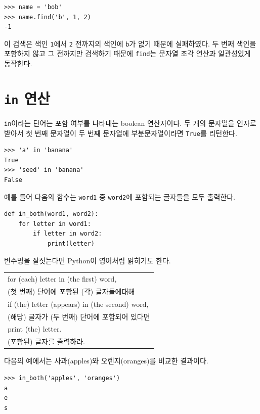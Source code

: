 \documentclass[10pt]{book}
\begin{document}
\begin{verbatim}
>>> name = 'bob'
>>> name.find('b', 1, 2)
-1
\end{verbatim}
%
이 검색은 색인 {\tt 1}에서 {\tt 2} 전까지의 색인에 {\tt b}가 없기
때문에 실패하였다.  두 번째 색인을 포함하지 않고 그 전까지만 검색하기
때문에 {\tt find}는 문자열 조각 연산과 일관성있게 동작한다.



\section{{\tt in} 연산}
\label{inboth}

{\tt in}이라는 단어는 포함 여부를 나타내는 boolean 연산자이다.  두 개의
문자열을 인자로 받아서 첫 번째 문자열이 두 번째 문자열에
부분문자열이라면 {\tt True}를 리턴한다.


\begin{verbatim}
>>> 'a' in 'banana'
True
>>> 'seed' in 'banana'
False
\end{verbatim}
%
예를 들어 다음의 함수는 {\tt word1} 중 {\tt word2}에 포함되는 글자들을
모두 출력한다.

\begin{verbatim}
def in_both(word1, word2):
    for letter in word1:
        if letter in word2:
            print(letter)
\end{verbatim}
%
변수명을 잘짓는다면 Python이 영어처럼 읽히기도 한다.  

\begin{tabular}{l}
for (each) letter in (the first) word, \\
\begingroup\scriptsize
(첫 번째) 단어에 포함된 (각) 글자들에대해 \endgroup\\
if (the) letter (appears) in (the second) word,\\
\begingroup\scriptsize
(해당) 글자가 (두 번째) 단어에 포함되어 있다면 \endgroup\\
 print (the) letter. \\
\begingroup\scriptsize
(포함된) 글자를 출력하라. \endgroup
\end{tabular}


다음의 예에서는 사과(apples)와 오렌지(oranges)를 비교한 결과이다. 


\begin{verbatim}
>>> in_both('apples', 'oranges')
a
e
s
\end{verbatim}
%
\end{document}
